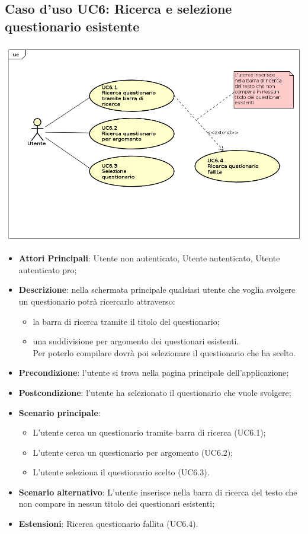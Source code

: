 \subsection{Caso d'uso UC6: Ricerca e selezione questionario esistente}
\begin{center}
\includegraphics[scale=0.5]{UML/UC6.png}
\end{center}
\begin{itemize}
\item\textbf{Attori Principali}: Utente non autenticato, Utente autenticato, Utente autenticato pro;
\item\textbf{Descrizione}: nella schermata principale qualsiasi utente che voglia svolgere un questionario potrà ricercarlo attraverso:
\begin{itemize}
\item la barra di ricerca tramite il titolo del questionario;
\item una suddivisione per argomento dei questionari esistenti.
\\Per poterlo compilare dovrà poi selezionare il questionario che ha scelto.
\end{itemize}	
\item\textbf{Precondizione}: l'utente si trova nella pagina principale dell'applicazione;
\item\textbf{Postcondizione}: l'utente ha selezionato il questionario che vuole svolgere;
\item\textbf{Scenario principale}:
\begin{itemize}
\item L'utente cerca un questionario tramite barra di ricerca (UC6.1);
\item L'utente cerca un questionario per argomento (UC6.2);
\item L'utente seleziona il questionario scelto (UC6.3).
\end{itemize}
\item\textbf{Scenario alternativo}: L'utente inserisce nella barra di ricerca del testo che non compare in nessun titolo dei questionari esistenti;
\item\textbf{Estensioni}: Ricerca questionario fallita (UC6.4).
\end{itemize}

